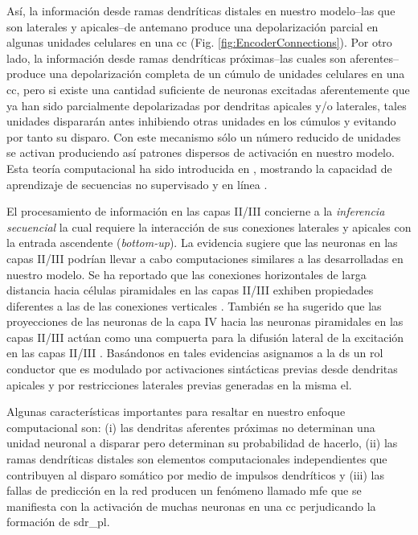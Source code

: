{Así, la información desde ramas dendríticas distales en nuestro modelo--las que son laterales y apicales--de antemano produce una depolarización parcial en algunas unidades celulares en una \gls{cc} (Fig. \ref{fig:EncoderConnections}).
Por otro lado, la información desde ramas dendríticas próximas--las cuales son aferentes--produce una depolarización completa de un cúmulo de unidades celulares en una \gls{cc}, pero si existe una cantidad suficiente de neuronas excitadas aferentemente que ya han sido parcialmente depolarizadas por dendritas apicales y/o laterales, tales unidades dispararán antes inhibiendo otras unidades en los cúmulos y evitando por tanto su disparo.
Con este mecanismo sólo un número reducido de unidades se activan produciendo así patrones dispersos de activación en nuestro modelo.
Esta teoría computacional ha sido introducida en \cite{10.3389/fncir.2016.00023}, mostrando la capacidad de aprendizaje de secuencias no supervisado y en línea \cite{Cui:2016:COS:3030654.3030660}.

El procesamiento de información en las capas II/III concierne a la \emph{inferencia secuencial} la cual requiere la interacción de sus conexiones laterales y apicales con la entrada ascendente (\emph{bottom-up}).
La evidencia sugiere que las neuronas en las capas II/III podrían llevar a cabo computaciones similares a las desarrolladas en nuestro modelo. Se ha reportado que las conexiones horizontales de larga distancia hacia células piramidales en las capas II/III exhiben propiedades diferentes a las de las conexiones verticales \cite{Yoshimura1931}.
También se ha sugerido que las proyecciones de las neuronas de la capa IV hacia las neuronas piramidales en las capas II/III actúan como una compuerta para la difusión lateral de la excitación en las capas II/III \cite{doi:10.1113/jphysiol.2001.012959}.
Basándonos en tales evidencias asignamos a la \gls{ds} un rol conductor que es modulado por activaciones sintácticas previas desde dendritas apicales y por restricciones laterales previas generadas en la misma \gls{el}.

Algunas características importantes para resaltar en nuestro enfoque computacional \cite{10.1371/journal.pone.0217966} son: (i) las dendritas aferentes próximas no determinan una unidad neuronal a disparar pero determinan su probabilidad de hacerlo, (ii) las ramas dendríticas distales son elementos computacionales independientes que contribuyen al disparo somático por medio de impulsos dendríticos y (iii) las fallas de predicción en la red producen un fenómeno llamado \gls{mfe} que se manifiesta con la activación de muchas neuronas en una \gls{cc} perjudicando la formación de \gls{sdr_pl}.

}

